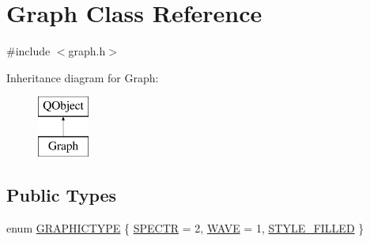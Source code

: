 \hypertarget{class_graph}{}\section{Graph Class Reference}
\label{class_graph}


{\ttfamily \#include $<$graph.\+h$>$}

Inheritance diagram for Graph\+:\begin{figure}[H]
\begin{center}
\leavevmode
\includegraphics[height=2.000000cm]{class_graph}
\end{center}
\end{figure}
\subsection*{Public Types}
\begin{DoxyCompactItemize}
\item 
enum \hyperlink{class_graph_ab17f5821c439d7728a144639aa849501}{G\+R\+A\+P\+H\+I\+C\+T\+Y\+PE} \{ \hyperlink{class_graph_ab17f5821c439d7728a144639aa849501a7f5feb538ca9b322e492121bde60adb1}{S\+P\+E\+C\+TR} = 2, 
\hyperlink{class_graph_ab17f5821c439d7728a144639aa849501a516c601a7ca33a017e277619c22357fb}{W\+A\+VE} = 1, 
\hyperlink{class_graph_ab17f5821c439d7728a144639aa849501a91a1ac591b3ca3bf16da6c3061f02109}{S\+T\+Y\+L\+E\+\_\+\+F\+I\+L\+L\+ED}
 \}
\end{DoxyCompactItemize}
